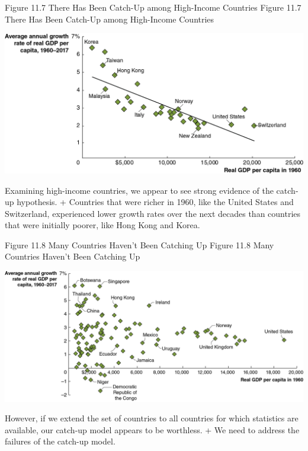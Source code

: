 \documentclass[
  12pt,
  ignorenonframetext,
]{beamer}
\begin{document}
\begin{frame}{Figure 11.7 There Has Been Catch-Up among High-Income
Countries}
\protect\hypertarget{figure-11.7-there-has-been-catch-up-among-high-income-countries}{}
Figure 11.7 There Has Been Catch-Up among High-Income Countries

\includegraphics[width=\textwidth,height=0.99\textheight]{imgs3/img_slide38a.png}

Examining high-income countries, we appear to see strong evidence of the
catch-up hypothesis. + Countries that were richer in 1960, like the
United States and Switzerland, experienced lower growth rates over the
next decades than countries that were initially poorer, like Hong Kong
and Korea.
\end{frame}

\begin{frame}{Figure 11.8 Many Countries Haven't Been Catching Up}
\protect\hypertarget{figure-11.8-many-countries-havent-been-catching-up}{}
Figure 11.8 Many Countries Haven't Been Catching Up

\includegraphics[width=\textwidth,height=0.99\textheight]{imgs3/img_slide39a.png}

However, if we extend the set of countries to all countries for which
statistics are available, our catch-up model appears to be worthless. +
We need to address the failures of the catch-up model.
\end{frame}
\end{document}
